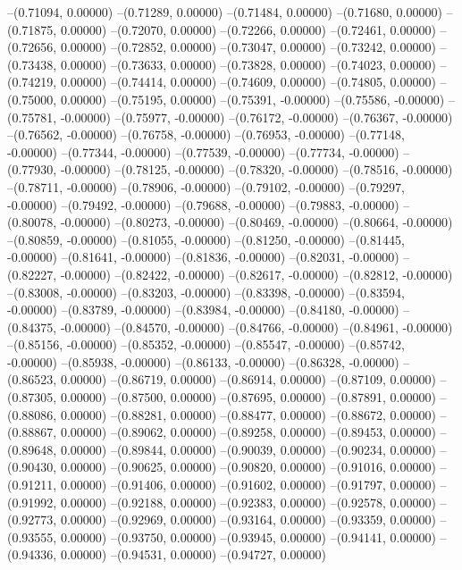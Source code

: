 --(0.71094, 0.00000)
--(0.71289, 0.00000)
--(0.71484, 0.00000)
--(0.71680, 0.00000)
--(0.71875, 0.00000)
--(0.72070, 0.00000)
--(0.72266, 0.00000)
--(0.72461, 0.00000)
--(0.72656, 0.00000)
--(0.72852, 0.00000)
--(0.73047, 0.00000)
--(0.73242, 0.00000)
--(0.73438, 0.00000)
--(0.73633, 0.00000)
--(0.73828, 0.00000)
--(0.74023, 0.00000)
--(0.74219, 0.00000)
--(0.74414, 0.00000)
--(0.74609, 0.00000)
--(0.74805, 0.00000)
--(0.75000, 0.00000)
--(0.75195, 0.00000)
--(0.75391, -0.00000)
--(0.75586, -0.00000)
--(0.75781, -0.00000)
--(0.75977, -0.00000)
--(0.76172, -0.00000)
--(0.76367, -0.00000)
--(0.76562, -0.00000)
--(0.76758, -0.00000)
--(0.76953, -0.00000)
--(0.77148, -0.00000)
--(0.77344, -0.00000)
--(0.77539, -0.00000)
--(0.77734, -0.00000)
--(0.77930, -0.00000)
--(0.78125, -0.00000)
--(0.78320, -0.00000)
--(0.78516, -0.00000)
--(0.78711, -0.00000)
--(0.78906, -0.00000)
--(0.79102, -0.00000)
--(0.79297, -0.00000)
--(0.79492, -0.00000)
--(0.79688, -0.00000)
--(0.79883, -0.00000)
--(0.80078, -0.00000)
--(0.80273, -0.00000)
--(0.80469, -0.00000)
--(0.80664, -0.00000)
--(0.80859, -0.00000)
--(0.81055, -0.00000)
--(0.81250, -0.00000)
--(0.81445, -0.00000)
--(0.81641, -0.00000)
--(0.81836, -0.00000)
--(0.82031, -0.00000)
--(0.82227, -0.00000)
--(0.82422, -0.00000)
--(0.82617, -0.00000)
--(0.82812, -0.00000)
--(0.83008, -0.00000)
--(0.83203, -0.00000)
--(0.83398, -0.00000)
--(0.83594, -0.00000)
--(0.83789, -0.00000)
--(0.83984, -0.00000)
--(0.84180, -0.00000)
--(0.84375, -0.00000)
--(0.84570, -0.00000)
--(0.84766, -0.00000)
--(0.84961, -0.00000)
--(0.85156, -0.00000)
--(0.85352, -0.00000)
--(0.85547, -0.00000)
--(0.85742, -0.00000)
--(0.85938, -0.00000)
--(0.86133, -0.00000)
--(0.86328, -0.00000)
--(0.86523, 0.00000)
--(0.86719, 0.00000)
--(0.86914, 0.00000)
--(0.87109, 0.00000)
--(0.87305, 0.00000)
--(0.87500, 0.00000)
--(0.87695, 0.00000)
--(0.87891, 0.00000)
--(0.88086, 0.00000)
--(0.88281, 0.00000)
--(0.88477, 0.00000)
--(0.88672, 0.00000)
--(0.88867, 0.00000)
--(0.89062, 0.00000)
--(0.89258, 0.00000)
--(0.89453, 0.00000)
--(0.89648, 0.00000)
--(0.89844, 0.00000)
--(0.90039, 0.00000)
--(0.90234, 0.00000)
--(0.90430, 0.00000)
--(0.90625, 0.00000)
--(0.90820, 0.00000)
--(0.91016, 0.00000)
--(0.91211, 0.00000)
--(0.91406, 0.00000)
--(0.91602, 0.00000)
--(0.91797, 0.00000)
--(0.91992, 0.00000)
--(0.92188, 0.00000)
--(0.92383, 0.00000)
--(0.92578, 0.00000)
--(0.92773, 0.00000)
--(0.92969, 0.00000)
--(0.93164, 0.00000)
--(0.93359, 0.00000)
--(0.93555, 0.00000)
--(0.93750, 0.00000)
--(0.93945, 0.00000)
--(0.94141, 0.00000)
--(0.94336, 0.00000)
--(0.94531, 0.00000)
--(0.94727, 0.00000)
